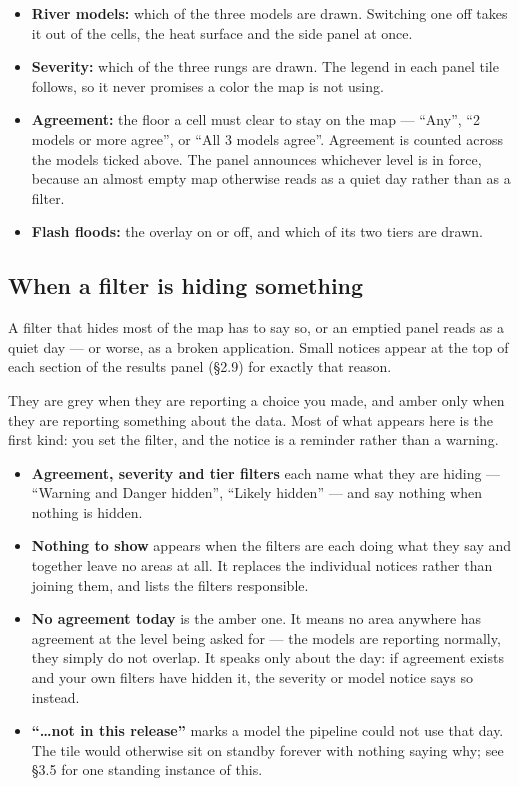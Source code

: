 \begin{itemize}
\item
  \textbf{River models:} which of the three models are drawn. Switching one off takes it out of the cells, the heat surface and the side panel at once.
\item
  \textbf{Severity:} which of the three rungs are drawn. The legend in each panel tile follows, so it never promises a color the map is not using.
\item
  \textbf{Agreement:} the floor a cell must clear to stay on the map --- ``Any'', ``2 models or more agree'', or ``All 3 models agree''. Agreement is counted across the models ticked above. The panel announces whichever level is in force, because an almost empty map otherwise reads as a quiet day rather than as a filter.
\item
  \textbf{Flash floods:} the overlay on or off, and which of its two tiers are drawn.
\end{itemize}

\subsection{When a filter is hiding something}\label{filter-notices}

A filter that hides most of the map has to say so, or an emptied panel reads as a quiet day --- or worse, as a broken application.
Small notices appear at the top of each section of the results panel (\S2.9) for exactly that reason.

They are grey when they are reporting a choice you made, and amber only when they are reporting something about the data.
Most of what appears here is the first kind: you set the filter, and the notice is a reminder rather than a warning.

\begin{itemize}
\item
  \textbf{Agreement, severity and tier filters} each name what they are hiding --- ``Warning and Danger hidden'', ``Likely hidden'' --- and say nothing when nothing is hidden.
\item
  \textbf{Nothing to show} appears when the filters are each doing what they say and together leave no areas at all. It replaces the individual notices rather than joining them, and lists the filters responsible.
\item
  \textbf{No agreement today} is the amber one. It means no area anywhere has agreement at the level being asked for --- the models are reporting normally, they simply do not overlap. It speaks only about the day: if agreement exists and your own filters have hidden it, the severity or model notice says so instead.
\item
  \textbf{``\ldots not in this release''} marks a model the pipeline could not use that day. The tile would otherwise sit on standby forever with nothing saying why; see \S3.5 for one standing instance of this.
\end{itemize}

